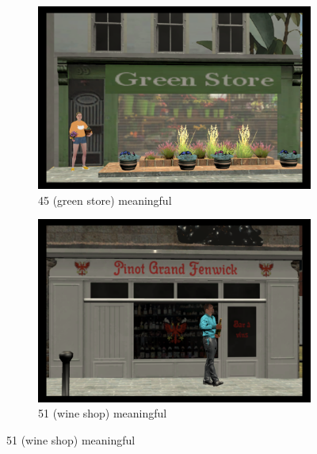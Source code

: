 \begin{figure}[!htb]
	\begin{subfigure}[b]{0.48\linewidth}
		\includegraphics[width=\linewidth]{figures/starting_locations_appx/45_S(green store)_A.PNG}
		\caption{45 (green store) meaningful}
		\label{fig:45_S(green store)_A}
	\end{subfigure}
	\begin{subfigure}[b]{0.48\linewidth}
		\includegraphics[width=\linewidth]{figures/starting_locations_appx/51_S(wine shop)_A.PNG}
		\caption{51 (wine shop) meaningful}
		\label{fig:51_S(wine shop)_A}
	\end{subfigure}
	

\end{figure}
